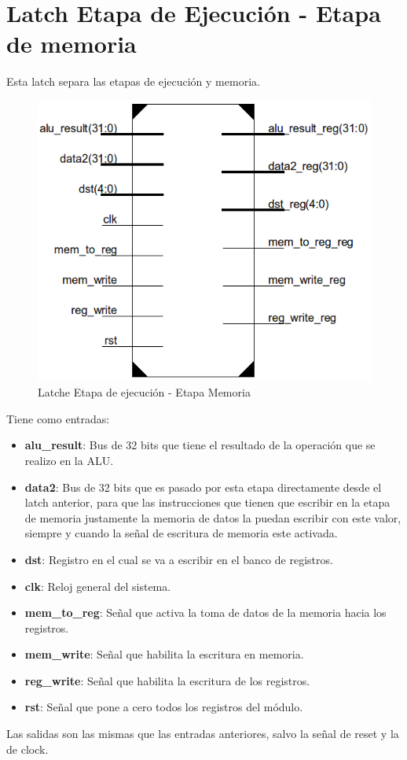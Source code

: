 \section{Latch Etapa de Ejecuci\'on - Etapa de memoria}

Esta latch separa las etapas de ejecuci\'on y memoria.
\begin{figure}[H]
\centering
\includegraphics[scale=0.35]{img/latch_ex_m}
\caption{Latche Etapa de ejecuci\'on - Etapa Memoria}
\label{fig:latch_ex_mem}
\end{figure}
Tiene como entradas:
\begin{itemize}
  \item \textbf{alu\_result}: Bus de 32 bits que tiene el resultado de la operaci\'on que se realizo en la ALU.
  \item \textbf{data2}: Bus de 32 bits que es pasado por esta etapa directamente desde el latch anterior, para que las instrucciones que tienen que escribir en la etapa de memoria justamente la memoria de datos la puedan escribir con este valor, siempre y cuando la señal de escritura de memoria este activada.
  \item \textbf{dst}: Registro en el cual se va a escribir en el banco de registros.
  \item \textbf{clk}: Reloj general del sistema.
  \item \textbf{mem\_to\_reg}: Señal que activa la toma de datos de la memoria hacia los registros.
  \item \textbf{mem\_write}: Señal que habilita la escritura en memoria.
  \item \textbf{reg\_write}: Señal que habilita la escritura de los registros.
  \item \textbf{rst}: Señal que pone a cero todos los registros del m\'odulo.
\end{itemize}

Las salidas son las mismas que las entradas anteriores, salvo la señal de reset y la de clock.